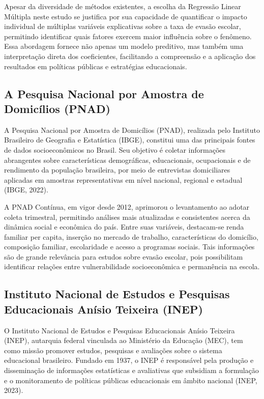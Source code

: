 \documentclass[english, spanish, brazilian]{RBIEarticle} %
\begin{document}
Apesar da diversidade de métodos existentes, a escolha da Regressão Linear Múltipla neste estudo se justifica por sua capacidade de quantificar o impacto individual de múltiplas variáveis explicativas sobre a taxa de evasão escolar, permitindo identificar quais fatores exercem maior influência sobre o fenômeno. Essa abordagem fornece não apenas um modelo preditivo, mas também uma interpretação direta dos coeficientes, facilitando a compreensão e a aplicação dos resultados em políticas públicas e estratégias educacionais.

\subsection{A Pesquisa Nacional por Amostra de Domicílios (PNAD)}
A Pesquisa Nacional por Amostra de Domicílios (PNAD), realizada pelo Instituto Brasileiro de Geografia e Estatística (IBGE), constitui uma das principais fontes de dados socioeconômicos no Brasil. Seu objetivo é coletar informações abrangentes sobre características demográficas, educacionais, ocupacionais e de rendimento da população brasileira, por meio de entrevistas domiciliares aplicadas em amostras representativas em nível nacional, regional e estadual (IBGE, 2022).

A PNAD Contínua, em vigor desde 2012, aprimorou o levantamento ao adotar coleta trimestral, permitindo análises mais atualizadas e consistentes acerca da dinâmica social e econômica do país. Entre suas variáveis, destacam-se renda familiar per capita, inserção no mercado de trabalho, características do domicílio, composição familiar, escolaridade e acesso a programas sociais. Tais informações são de grande relevância para estudos sobre evasão escolar, pois possibilitam identificar relações entre vulnerabilidade socioeconômica e permanência na escola.

\subsection{Instituto Nacional de Estudos e Pesquisas Educacionais Anísio Teixeira (INEP)}
O Instituto Nacional de Estudos e Pesquisas Educacionais Anísio Teixeira (INEP), autarquia federal vinculada ao Ministério da Educação (MEC), tem como missão promover estudos, pesquisas e avaliações sobre o sistema educacional brasileiro. Fundado em 1937, o INEP é responsável pela produção e disseminação de informações estatísticas e avaliativas que subsidiam a formulação e o monitoramento de políticas públicas educacionais em âmbito nacional (INEP, 2023).
\end{document}
